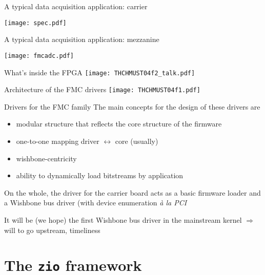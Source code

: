 \documentclass[compress,red]{beamer}
\begin{document}
\begin{frame}{A typical data acquisition application: carrier}
\begin{center}
\texttt{[image: spec.pdf]}
\end{center}
\end{frame}

\begin{frame}{A typical data acquisition application: mezzanine}
\begin{center}
\texttt{[image: fmcadc.pdf]}
\end{center}
\end{frame}

\begin{frame}{What's inside the FPGA}
\texttt{[image: THCHMUST04f2\_talk.pdf]}
\end{frame}

\begin{frame}{Architecture of the FMC drivers}
\texttt{[image: THCHMUST04f1.pdf]}
\end{frame}

\begin{frame}{Drivers for the FMC family}
The main concepts for the design of these drivers are
\begin{itemize}
\pause
\item modular structure that reflects the core structure of the firmware
\pause
\item one-to-one mapping driver $\leftrightarrow$ core (usually)
\pause
\item wishbone-centricity
\pause
\item ability to dynamically load bitstreams by application
\end{itemize}
\pause
On the whole, the driver for the carrier board acts as a basic firmware
loader and a Wishbone bus driver (with device enumeration
\emph{\`a la PCI}

\pause
It will be (we hope) the first Wishbone bus driver in the mainstream
kernel $\Rightarrow$ will to go upstream, timeliness
\end{frame}

\section{The \texttt{zio} framework}
\end{document}
